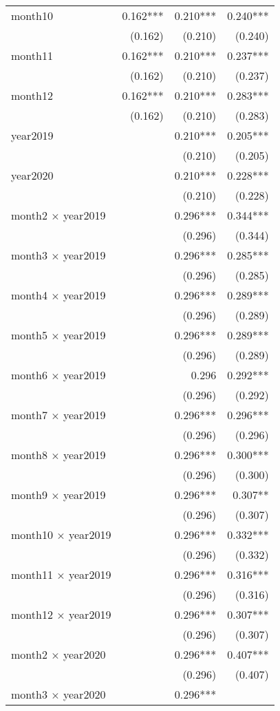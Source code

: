 \documentclass[
]{article}
\begin{document}
\begin{longtable}[]{@{}lrrr@{}}
month10 & 0.162*** & 0.210*** & 0.240*** \\
& (0.162) & (0.210) & (0.240) \\
month11 & 0.162*** & 0.210*** & 0.237*** \\
& (0.162) & (0.210) & (0.237) \\
month12 & 0.162*** & 0.210*** & 0.283*** \\
& (0.162) & (0.210) & (0.283) \\
year2019 & & 0.210*** & 0.205*** \\
& & (0.210) & (0.205) \\
year2020 & & 0.210*** & 0.228*** \\
& & (0.210) & (0.228) \\
month2 × year2019 & & 0.296*** & 0.344*** \\
& & (0.296) & (0.344) \\
month3 × year2019 & & 0.296*** & 0.285*** \\
& & (0.296) & (0.285) \\
month4 × year2019 & & 0.296*** & 0.289*** \\
& & (0.296) & (0.289) \\
month5 × year2019 & & 0.296*** & 0.289*** \\
& & (0.296) & (0.289) \\
month6 × year2019 & & 0.296 & 0.292*** \\
& & (0.296) & (0.292) \\
month7 × year2019 & & 0.296*** & 0.296*** \\
& & (0.296) & (0.296) \\
month8 × year2019 & & 0.296*** & 0.300*** \\
& & (0.296) & (0.300) \\
month9 × year2019 & & 0.296*** & 0.307** \\
& & (0.296) & (0.307) \\
month10 × year2019 & & 0.296*** & 0.332*** \\
& & (0.296) & (0.332) \\
month11 × year2019 & & 0.296*** & 0.316*** \\
& & (0.296) & (0.316) \\
month12 × year2019 & & 0.296*** & 0.307*** \\
& & (0.296) & (0.307) \\
month2 × year2020 & & 0.296*** & 0.407*** \\
& & (0.296) & (0.407) \\
month3 × year2020 & & 0.296*** & \\

\end{longtable}
\end{document}
